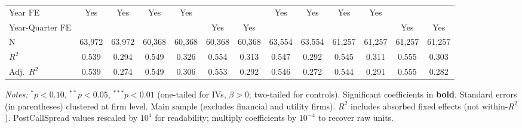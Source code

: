 \begin{landscape}
\begin{table}[H]
\begin{tabular}{lcccccccccccc}
Year FE & Yes & Yes & Yes & Yes &  &  & Yes & Yes & Yes & Yes &  &  \\
Year-Quarter FE &  &  &  &  & Yes & Yes &  &  &  &  & Yes & Yes \\
\midrule
N & 63,972 & 63,972 & 60,368 & 60,368 & 60,368 & 60,368 & 63,554 & 63,554 & 61,257 & 61,257 & 61,257 & 61,257 \\
$R^2$ & 0.539 & 0.294 & 0.549 & 0.326 & 0.554 & 0.313 & 0.547 & 0.292 & 0.545 & 0.311 & 0.555 & 0.303 \\
Adj.~$R^2$ & 0.539 & 0.274 & 0.549 & 0.306 & 0.553 & 0.292 & 0.546 & 0.272 & 0.544 & 0.291 & 0.555 & 0.282 \\
\bottomrule
\end{tabular}
\begin{minipage}{\linewidth}
\vspace{2pt}\scriptsize
\textit{Notes:} $^{*}p<0.10$, $^{**}p<0.05$, $^{***}p<0.01$ (one-tailed for IVs, $\beta > 0$; two-tailed for controls).
 Significant coefficients in \textbf{bold}.
 Standard errors (in parentheses) clustered at firm level.
 Main sample (excludes financial and utility firms).
 $R^2$ includes absorbed fixed effects (not within-$R^2$).
 PostCallSpread values rescaled by $10^4$ for readability; multiply coefficients by $10^{-4}$ to recover raw units.
\end{minipage}
\end{table}
\end{landscape}
